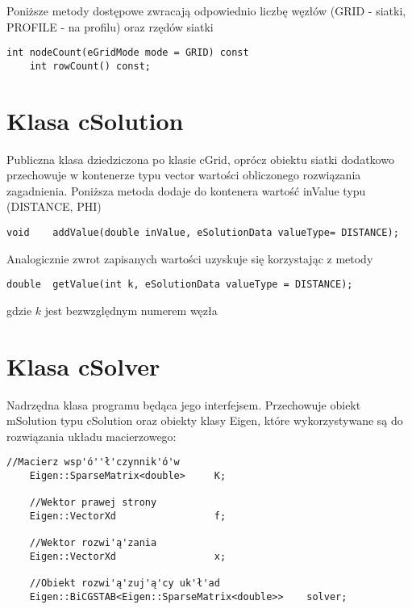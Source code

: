 \noindent Poniższe metody dostępowe zwracają odpowiednio liczbę węzłów \newline (\textsf{GRID} - siatki, \textsf{PROFILE} - na profilu) oraz rzędów siatki
\begin{lstlisting}[style = nonumbers]
	int	nodeCount(eGridMode mode = GRID) const	
	int	rowCount() const;
\end{lstlisting}	

\section{Klasa cSolution}

\indent\indent Publiczna klasa dziedziczona po klasie \textsf{cGrid}, oprócz obiektu siatki dodatkowo przechowuje w kontenerze typu \textsf{vector} wartości obliczonego rozwiązania zagadnienia. Poniższa metoda dodaje do kontenera wartość \textsf{inValue} typu (\textsf{DISTANCE, PHI})

\begin{lstlisting}[style = nonumbers]
	void	addValue(double inValue, eSolutionData valueType= DISTANCE);	
\end{lstlisting}
Analogicznie zwrot zapisanych wartości uzyskuje się korzystając z metody

\begin{lstlisting}[style = nonumbers]
	double	getValue(int k, eSolutionData valueType = DISTANCE);
\end{lstlisting}
gdzie $k$ jest bezwzględnym numerem węzła 


\section{Klasa cSolver}

\indent\indent Nadrzędna klasa programu będąca jego interfejsem. Przechowuje obiekt \textsf{mSolution} typu \textsf{cSolution} oraz obiekty klasy \textsf{Eigen}, które wykorzystywane są do rozwiązania układu macierzowego:

\begin{lstlisting}[style = nonumbers]
	//Macierz wsp'ó''ł'czynnik'ó'w
	Eigen::SparseMatrix<double>		K;
	
	//Wektor prawej strony		
	Eigen::VectorXd					f;	
	
	//Wektor rozwi'ą'zania		
	Eigen::VectorXd					x;	
		
	//Obiekt rozwi'ą'zuj'ą'cy uk'ł'ad			 
	Eigen::BiCGSTAB<Eigen::SparseMatrix<double>>	solver;		
\end{lstlisting}



